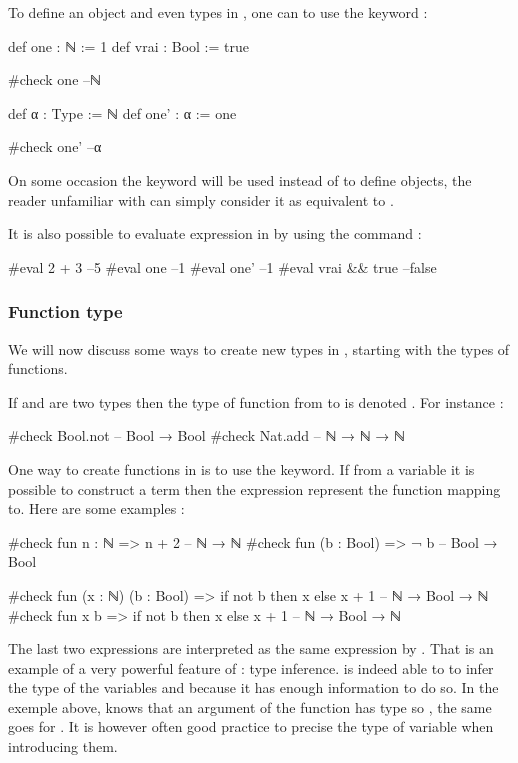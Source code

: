 
To define an object and even types in \Lean, one can to use the  keyword :
\begin{leancode}
def one : ℕ := 1
def vrai : Bool := true

#check one --ℕ

def  α : Type := ℕ
def one' : α := one

#check one' --α
\end{leancode}


On some occasion the  keyword will be used instead of  to define objects, the reader unfamiliar with \Lean can simply consider it as equivalent to .

It is also possible to evaluate expression in \Lean by using the  command :
\begin{leancode}
#eval 2 + 3 --5
#eval one --1
#eval one' --1
#eval vrai && true --false
\end{leancode}

\subsubsection{Function type}
We will now discuss some ways to create new types in \Lean, starting with the types of functions. 

If  and  are two types then the type of function from  to  is denoted . For instance :
\begin{leancode}
#check Bool.not -- Bool → Bool 
#check Nat.add -- ℕ → ℕ → ℕ
\end{leancode}

One way to create functions in \Lean is to use the  keyword. If from a variable  it is possible to construct a term  then the expression  represent the function mapping  to. Here are some examples :
\begin{leancode}
#check fun n : ℕ => n + 2 -- ℕ → ℕ
#check fun (b : Bool) => ¬ b -- Bool → Bool

#check fun (x : ℕ) (b : Bool) => if not b then x else x + 1   -- ℕ → Bool → ℕ
#check fun x b => if not b then x else x + 1   -- ℕ → Bool → ℕ
\end{leancode}


The last two expressions are interpreted as the same expression by \Lean. That is an example of a very powerful feature of \Lean : type inference. \Lean is indeed able to to infer the type of the variables  and  because it has enough information to do so. In the exemple above, \Lean knows that an argument of the function  has type  so , the same goes for . It is however often good practice to precise the type of variable when introducing them. 

